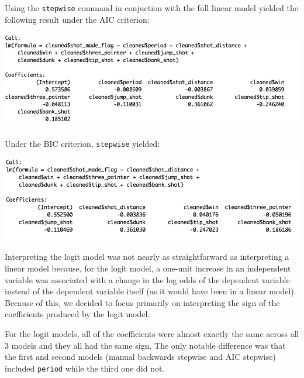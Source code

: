 \documentclass[paper=a4, fontsize=11pt]{scrartcl} %
\numberwithin{equation}{section} %
\numberwithin{figure}{section} %
\numberwithin{table}{section} %
\begin{document}
\hspace*{1cm} Using the \texttt{stepwise} command in conjuction with the full linear model yielded the following result under the AIC criterion:
\begin{center}
	\includegraphics[width=14cm]{img/lmaic}
\end{center}
\hspace*{1cm} Under the BIC criterion, \texttt{stepwise} yielded:
\begin{center}
	\includegraphics[width=14cm]{img/lmbic}
\end{center}
\hspace*{1cm}Interpreting the logit model was not nearly as straightforward as interpreting a linear model because, for the logit model, a one-unit increase in an independent variable was associated with a change in the log odds of the dependent variable instead of the dependent variable itself (as it would have been in a linear model). Because of this, we decided to focus primarily on interpreting the sign of the coefficients produced by the logit model.

\hspace*{1cm}For the logit models, all of the coefficients were almost exactly the same across all 3 models and they all had the same sign. The only notable difference was that the first and second models (manual backwards stepwise and AIC stepwise) included \texttt{period} while the third one did not. 
\end{document}
